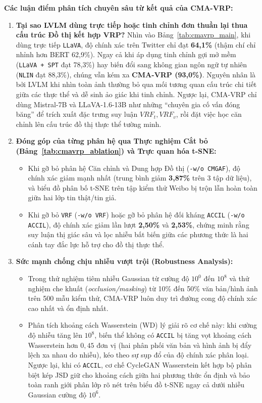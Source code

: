 \documentclass[conference,10pt]{IEEEtran}
\begin{document}
\textbf{Các luận điểm phân tích chuyên sâu từ kết quả của CMA-VRP:}
\begin{enumerate}
    \item \textbf{Tại sao LVLM dùng trực tiếp hoặc tinh chỉnh đơn thuần lại thua cấu trúc Đồ thị kết hợp VRP?}
    Nhìn vào Bảng~\ref{tab:cmavrp_main}, khi dùng trực tiếp \texttt{LLaVA}, độ chính xác trên Twitter chỉ đạt \textbf{64,1\%} (thậm chí chỉ nhỉnh hơn BERT 62,9\%). Ngay cả khi áp dụng tinh chỉnh gợi mở mềm (\texttt{LLaVA + SPT} đạt 78,3\%) hay biến đổi sang không gian ngôn ngữ tự nhiên (\texttt{NLIN} đạt 88,3\%), chúng vẫn kém xa \textbf{CMA-VRP (93,0\%)}. Nguyên nhân là bởi LVLM khi nhìn toàn ảnh thường bỏ qua mối tương quan cấu trúc chi tiết giữa các thực thể và dễ sinh ảo giác khi tinh chỉnh. Ngược lại, CMA-VRP chỉ dùng Mistral-7B và LLaVA-1.6-13B như những ``chuyên gia cố vấn đóng băng'' để trích xuất đặc trưng suy luận $VRF_t, VRF_v$, rồi đặt việc học căn chỉnh lên cấu trúc đồ thị thực thể tường minh.
    \item \textbf{Đóng góp của từng phân hệ qua Thực nghiệm Cắt bỏ (Bảng~\ref{tab:cmavrp_ablation}) và Trực quan hóa t-SNE:}
    \begin{itemize}
        \item Khi gỡ bỏ phân hệ Căn chỉnh và Dung hợp Đồ thị (\texttt{-w/o CMGAF}), độ chính xác giảm mạnh nhất (trung bình giảm \textbf{3,87\%} trên 3 tập dữ liệu), và biểu đồ phân bố t-SNE trên tập kiểm thử Weibo bị trộn lẫn hoàn toàn giữa hai lớp tin thật/tin giả.
        \item Khi gỡ bỏ \texttt{VRF} (\texttt{-w/o VRF}) hoặc gỡ bỏ phân hệ đối kháng \texttt{ACCIL} (\texttt{-w/o ACCIL}), độ chính xác giảm lần lượt \textbf{2,50\%} và \textbf{2,53\%}, chứng minh rằng suy luận thị giác sâu và lọc nhiễu bất biến giữa các phương thức là hai cánh tay đắc lực hỗ trợ cho đồ thị thực thể.
    \end{itemize}
    \item \textbf{Sức mạnh chống chịu nhiễu vượt trội (Robustness Analysis):}
    \begin{itemize}
        \item Trong thử nghiệm tiêm nhiễu Gaussian từ cường độ $10^0$ đến $10^8$ và thử nghiệm che khuất (\textit{occlusion/masking}) từ 10\% đến 50\% văn bản/hình ảnh trên 500 mẫu kiểm thử, CMA-VRP luôn duy trì đường cong độ chính xác cao nhất và ổn định nhất.
        \item Phân tích khoảng cách Wasserstein (WD) lý giải rõ cơ chế này: khi cường độ nhiễu tăng lên $10^8$, biến thể không có \texttt{ACCIL} bị tăng vọt khoảng cách Wasserstein hơn $0,45$ đơn vị (hai phân phối văn bản và hình ảnh bị đẩy lệch xa nhau do nhiễu), kéo theo sự sụp đổ của độ chính xác phân loại. Ngược lại, khi có \texttt{ACCIL}, cơ chế CycleGAN Wasserstein kết hợp bộ phân biệt kép JSD giữ cho khoảng cách giữa hai phương thức ổn định và bảo toàn ranh giới phân lớp rõ nét trên biểu đồ t-SNE ngay cả dưới nhiễu Gaussian cường độ $10^6$.
    \end{itemize}
\end{enumerate}
\end{document}
